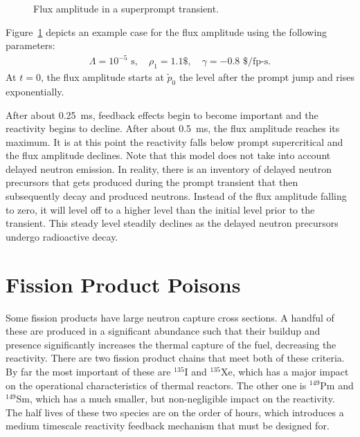 \begin{figure}[tb!]
\begin{center}
\caption{Flux amplitude in a superprompt transient.}
 \label{Fig:kinetics_superpromptTransientFeedback}
\end{center}
\end{figure}

Figure~\ref{Fig:kinetics_superpromptTransientFeedback} depicts an example case for the flux amplitude using the following parameters:
\begin{align}
  \Lambda = 10^{-5} \text{ s}, \quad \rho_1 = 1.1\text{\$}, \quad \gamma = -0.8 \text{ \$/fp-s}. \nonumber
\end{align}
At $t = 0$, the flux amplitude starts at $\tilde{p}_0$ the level after the prompt jump and rises exponentially. 

After about 0.25~ms, feedback effects begin to become important and the reactivity begins to decline. After about 0.5~ms, the flux amplitude reaches its maximum. It is at this point the reactivity falls below prompt supercritical and the flux amplitude declines. Note that this model does not take into account delayed neutron emission. In reality, there is an inventory of delayed neutron precursors that gets produced during the prompt transient that then subsequently decay and produced neutrons. Instead of the flux amplitude falling to zero, it will level off to a higher level than the initial level prior to the transient. This steady level steadily declines as the delayed neutron precursors undergo radioactive decay.

\section{Fission Product Poisons}

Some fission products have large neutron capture cross sections. A handful of these are produced in a significant abundance such that their buildup and presence significantly increases the thermal capture of the fuel, decreasing the reactivity. There are two fission product chains that meet both of these criteria. By far the most important of these are $^{135}$I and $^{135}$Xe, which has a major impact on the operational characteristics of thermal reactors. The other one is $^{149}$Pm and $^{149}$Sm, which has a much smaller, but non-negligible impact on the reactivity. The half lives of these two species are on the order of hours, which introduces a medium timescale reactivity feedback mechanism that must be designed for.

